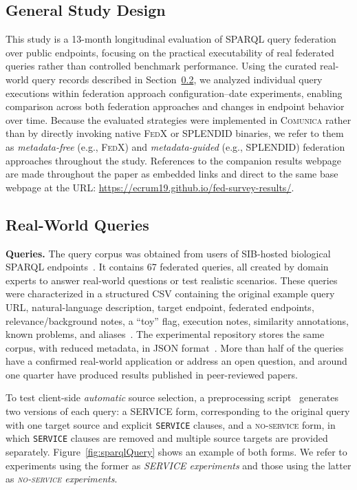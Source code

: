 \documentclass[runningheads]{llncs}
\begin{document}
\subsection{General Study Design}\label{sec4.1}
This study is a 13-month longitudinal evaluation of SPARQL query federation over public endpoints, focusing on the practical executability of real federated queries rather than controlled benchmark performance. 
Using the curated real-world query records described in Section~\ref{sec4.2}, we analyzed individual query executions within federation approach configuration--date experiments, enabling comparison across both federation approaches and changes in endpoint behavior over time. 
Because the evaluated strategies were implemented in \textsc{Comunica} rather than by directly invoking native \textsc{FedX} or \textsc{SPLENDID} binaries, we refer to them as \textit{metadata-free} (e.g., \textsc{FedX}) and \textit{metadata-guided} (e.g., \textsc{SPLENDID}) federation approaches throughout the study.
References to the companion results webpage are made throughout the paper as embedded links and direct to the same base webpage at the URL: \url{https://ecrum19.github.io/fed-survey-results/}.

\subsection{Real-World Queries}\label{sec4.2}
\textbf{Queries.}
The query corpus was obtained from users of SIB-hosted biological SPARQL endpoints~\cite{Bolleman2025sibqueries}. 
It contains 67 federated queries, all created by domain experts to answer real-world questions or test realistic scenarios. 
These queries were characterized in a structured CSV containing the original example query URL, natural-language description, target endpoint, federated endpoints, relevance/background notes, a ``toy'' flag, execution notes, similarity annotations, known problems, and aliases~\cite{fedSurveyResultsRepo}. 
The experimental repository stores the same corpus, with reduced metadata, in JSON format~\cite{fedSparqlSurveyExperimentsRepo}. 
More than half of the queries have a confirmed real-world application or address an open question, and around one quarter have produced results published in peer-reviewed papers.

To test client-side \textit{automatic} source selection, a preprocessing script~\cite{fedSparqlSurveyExperimentsRepo} generates two versions of each query: a \textsc{SERVICE} form, corresponding to the original query with one target source and explicit \texttt{SERVICE} clauses, and a \textsc{no-service} form, in which \texttt{SERVICE} clauses are removed and multiple source targets are provided separately. 
Figure~\ref{fig:sparqlQuery} shows an example of both forms. 
We refer to experiments using the former as \textit{\textsc{SERVICE} experiments} and those using the latter as \textit{\textsc{no-service} experiments}.
\end{document}

